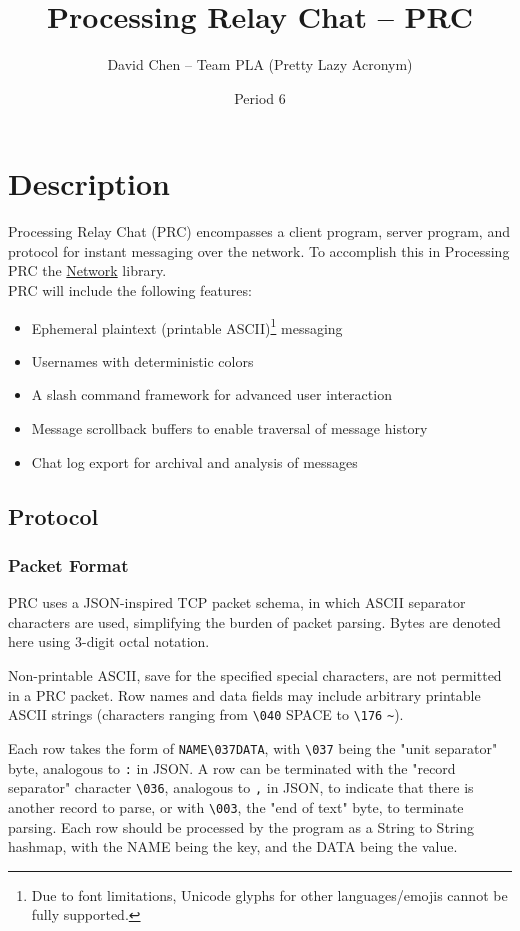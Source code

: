 \documentclass{article}
\title{Processing Relay Chat -- PRC}
\author{David Chen -- Team PLA (Pretty Lazy Acronym)}
\date{Period 6}
\begin{document}
\maketitle

\section{Description}
Processing Relay Chat (PRC) encompasses a client program, server program, and protocol for instant messaging over the network. To accomplish this in Processing PRC the \href{https://processing.org/reference/libraries/net/index.html}{Network} library.\\
PRC will include the following features:
\begin{itemize}
    \item Ephemeral plaintext (printable ASCII)\footnote{Due to font limitations, Unicode glyphs for other languages/emojis cannot be fully supported.} messaging
    \item Usernames with deterministic colors
    \item A slash command framework for advanced user interaction
    \item Message scrollback buffers to enable traversal of message history
    \item Chat log export for archival and analysis of messages
\end{itemize}

\subsection{Protocol}
\subsubsection{Packet Format}
PRC uses a JSON-inspired TCP packet schema, in which ASCII separator characters are used, simplifying the burden of packet parsing. Bytes are denoted here using 3-digit octal notation.

Non-printable ASCII, save for the specified special characters, are not permitted in a PRC packet. Row names and data fields may include arbitrary printable ASCII strings (characters ranging from \verb|\040| SPACE to \verb|\176| \verb|~|).

Each row takes the form of \verb|NAME\037DATA|, with \verb|\037| being the "unit separator" byte, analogous to \verb|:| in JSON.
A row can be terminated with the "record separator" character \verb|\036|, analogous to \verb|,| in JSON, to indicate that there is another record to parse, or with \verb|\003|, the "end of text" byte, to terminate parsing. Each row should be processed by the program as a String to String hashmap, with the NAME being the key, and the DATA being the value.
\end{document}
